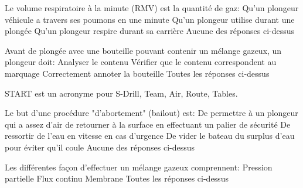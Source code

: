 \documentclass[english,10pt,a4paper, twoside]{article}
\begin{document}
\begin{outline}
		\1 Le volume respiratoire à la minute (RMV) est la quantité de gaz:
			\2 Qu'un plongeur véhicule a travers ses poumons en une minute
			\2 Qu'un plongeur utilise durant une plongée
			\2 Qu'un plongeur respire durant sa carrière
			\2 Aucune des réponses ci-dessus

		\1 Avant de plongée avec une bouteille pouvant contenir un mélange gazeux, un plongeur doit:
			\2 Analyser le contenu
			\2 Vérifier que le contenu correspondent au marquage
			\2 Correctement annoter la bouteille
			\2 Toutes les réponses ci-dessus

		\1 START est un acronyme pour S-Drill, Team, Air, Route, Tables. \vf

		\1 Le but d'une procédure "d'abortement" (bailout) est:
			\2 De permettre à un plongeur qui a assez d'air de retourner à la surface en effectuant un palier de sécurité
			\2 De ressortir de l'eau en vitesse en cas d'urgence
			\2 De vider le bateau du surplus d'eau pour éviter qu'il coule
			\2 Aucune des réponses ci-dessus

		\1 Les différentes façon d'effectuer un mélange gazeux comprennent:
			\2 Pression partielle
			\2 Flux continu
			\2 Membrane
			\2 Toutes les réponses ci-dessus

	\end{outline}
\end{document}
